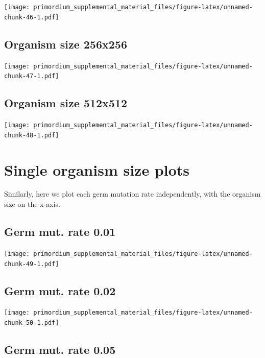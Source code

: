 \documentclass[
]{book}
\begin{document}
\texttt{[image: primordium\_supplemental\_material\_files/figure-latex/unnamed-chunk-46-1.pdf]}

\hypertarget{organism-size-256x256-1}{%
\subsection{Organism size 256x256}\label{organism-size-256x256-1}}

\texttt{[image: primordium\_supplemental\_material\_files/figure-latex/unnamed-chunk-47-1.pdf]}

\hypertarget{organism-size-512x512-1}{%
\subsection{Organism size 512x512}\label{organism-size-512x512-1}}

\texttt{[image: primordium\_supplemental\_material\_files/figure-latex/unnamed-chunk-48-1.pdf]}

\hypertarget{single-organism-size-plots-2}{%
\section{Single organism size plots}\label{single-organism-size-plots-2}}

Similarly, here we plot each germ mutation rate independently, with the organism size on the x-axis.

\hypertarget{germ-mut.-rate-0.01}{%
\subsection{Germ mut. rate 0.01}\label{germ-mut.-rate-0.01}}

\texttt{[image: primordium\_supplemental\_material\_files/figure-latex/unnamed-chunk-49-1.pdf]}

\hypertarget{germ-mut.-rate-0.02}{%
\subsection{Germ mut. rate 0.02}\label{germ-mut.-rate-0.02}}

\texttt{[image: primordium\_supplemental\_material\_files/figure-latex/unnamed-chunk-50-1.pdf]}

\hypertarget{germ-mut.-rate-0.05}{%
\subsection{Germ mut. rate 0.05}\label{germ-mut.-rate-0.05}}
\end{document}
